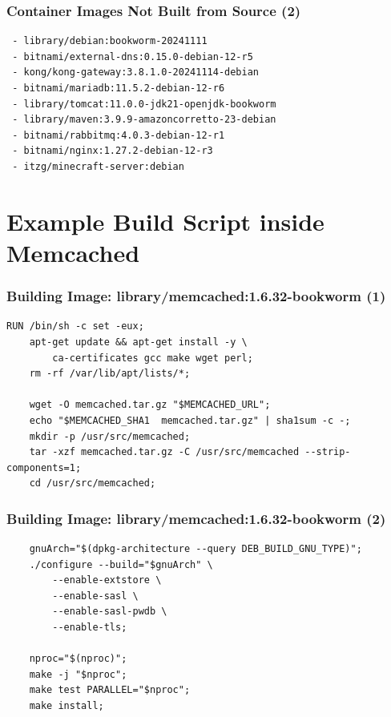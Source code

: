 \begin{frame}[fragile]
    \frametitle{Container Images Not Built from Source (2)}
    \begin{verbatim}
 - library/debian:bookworm-20241111
 - bitnami/external-dns:0.15.0-debian-12-r5
 - kong/kong-gateway:3.8.1.0-20241114-debian
 - bitnami/mariadb:11.5.2-debian-12-r6
 - library/tomcat:11.0.0-jdk21-openjdk-bookworm
 - library/maven:3.9.9-amazoncorretto-23-debian
 - bitnami/rabbitmq:4.0.3-debian-12-r1
 - bitnami/nginx:1.27.2-debian-12-r3
 - itzg/minecraft-server:debian
    \end{verbatim}
\end{frame}







\section{Example Build Script inside Memcached}
\begin{frame}[fragile]
    \frametitle{Building Image: library/memcached:1.6.32-bookworm (1)}
    \begin{verbatim}
RUN /bin/sh -c set -eux;
    apt-get update && apt-get install -y \
        ca-certificates gcc make wget perl;
    rm -rf /var/lib/apt/lists/*;

    wget -O memcached.tar.gz "$MEMCACHED_URL";
    echo "$MEMCACHED_SHA1  memcached.tar.gz" | sha1sum -c -;
    mkdir -p /usr/src/memcached;
    tar -xzf memcached.tar.gz -C /usr/src/memcached --strip-components=1;
    cd /usr/src/memcached;
    \end{verbatim}
\end{frame}

\begin{frame}[fragile]
    \frametitle{Building Image: library/memcached:1.6.32-bookworm (2)}
    \begin{verbatim}
    gnuArch="$(dpkg-architecture --query DEB_BUILD_GNU_TYPE)";
    ./configure --build="$gnuArch" \
        --enable-extstore \
        --enable-sasl \
        --enable-sasl-pwdb \
        --enable-tls;
    
    nproc="$(nproc)";
    make -j "$nproc";
    make test PARALLEL="$nproc";
    make install;
    \end{verbatim}
\end{frame}


